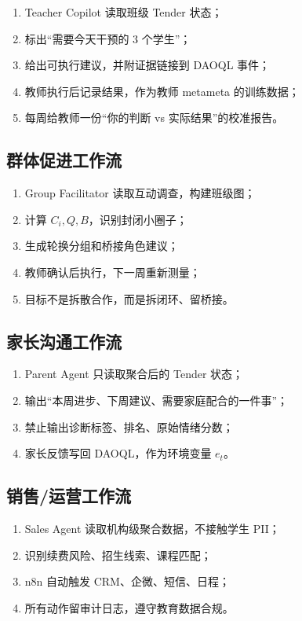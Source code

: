 \documentclass[UTF8,a4paper,11pt]{ctexart}
\begin{document}
\begin{enumerate}[leftmargin=2em]
\item Teacher Copilot 读取班级 Tender 状态；
\item 标出“需要今天干预的 3 个学生”；
\item 给出可执行建议，并附证据链接到 DAOQL 事件；
\item 教师执行后记录结果，作为教师 metameta 的训练数据；
\item 每周给教师一份“你的判断 vs 实际结果”的校准报告。
\end{enumerate}

\subsection{群体促进工作流}

\begin{enumerate}[leftmargin=2em]
\item Group Facilitator 读取互动调查，构建班级图；
\item 计算 $C_i,Q,B$，识别封闭小圈子；
\item 生成轮换分组和桥接角色建议；
\item 教师确认后执行，下一周重新测量；
\item 目标不是拆散合作，而是拆闭环、留桥接。
\end{enumerate}

\subsection{家长沟通工作流}

\begin{enumerate}[leftmargin=2em]
\item Parent Agent 只读取聚合后的 Tender 状态；
\item 输出“本周进步、下周建议、需要家庭配合的一件事”；
\item 禁止输出诊断标签、排名、原始情绪分数；
\item 家长反馈写回 DAOQL，作为环境变量 $e_t$。
\end{enumerate}

\subsection{销售/运营工作流}

\begin{enumerate}[leftmargin=2em]
\item Sales Agent 读取机构级聚合数据，不接触学生 PII；
\item 识别续费风险、招生线索、课程匹配；
\item n8n 自动触发 CRM、企微、短信、日程；
\item 所有动作留审计日志，遵守教育数据合规。
\end{enumerate}
\end{document}
